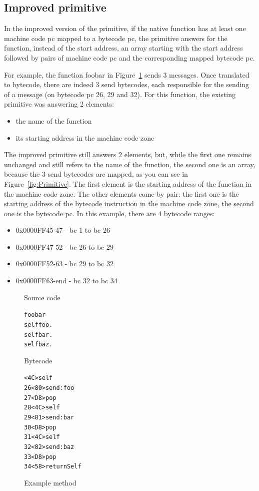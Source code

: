 \documentclass[10pt,preprint,nonatbib]{sigplanconf}
\newcommand{\figref}[1]{Figure~\ref{fig:#1}}
\newenvironment{code}
    {\begin{alltt}\sffamily}
    {\end{alltt}\normalsize}
\begin{document}
\subsection{Improved primitive}

In the improved version of the primitive, if the native function has at least one machine code pc mapped to a bytecode pc, the primitive answers for the function, instead of the start address, an array starting with the start address followed by pairs of machine code pc and the corresponding mapped bytecode pc. 

For example, the function foobar in \figref{Code} sends 3 messages. Once translated to bytecode, there are indeed 3 send bytecodes, each responsible for the sending of a message (on bytecode pc 26, 29 and 32). For this function, the existing primitive was answering 2 elements: 
\begin{itemize}
	\item the name of the function
	\item its starting address in the machine code zone
\end{itemize}

The improved primitive still answers 2 elements, but, while the first one remains unchanged and still refers to the name of the function, the second one is an array, because the 3 send bytecodes are mapped, as you can see in \figref{Primitive}. The first element is the starting address of the function in the machine code zone. The other elements come by pair: the first one is the starting address of the bytecode instruction in the machine code zone, the second one is the bytecode pc.
In this example, there are 4 bytecode ranges: 

\begin{itemize}
	\item 0x0000FF45-47 - bc 1 to bc 26
	\item 0x0000FF47-52 - bc 26 to bc 29
	\item 0x0000FF52-63 - bc 29 to bc 32
	\item 0x0000FF63-end - bc 32 to bc 34
\end{itemize}

\begin{figure}
    \begin{center}
    	Source code
	\begin{code}
	foobar
	\hspace{0.5cm} self foo.
	\hspace{0.5cm} self bar.
	\hspace{0.5cm} self baz.
	\end{code}
	Bytecode
	\begin{code}
	25 \textless4C\textgreater self
	26 \textless80\textgreater send: foo
	27 \textless{D8}\textgreater pop
	28 \textless4C\textgreater self
	29 \textless81\textgreater send: bar
	30 \textless{D8}\textgreater pop
	31 \textless4C\textgreater self
	32 \textless82\textgreater send: baz
	33 \textless{D8}\textgreater pop
	34 \textless58\textgreater returnSelf
	\end{code}
	\caption{Example method}
    \label{fig:Code}
    \end{center}
\end{figure}
\end{document}
